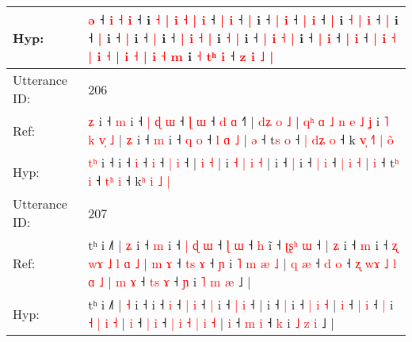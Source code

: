 \documentclass[10pt]{article}
\DeclareRobustCommand{\hl}[1]{{\textcolor{red}{#1}}}
\begin{document}
\begin{longtable}{ll}
 \\
Hyp: & \hl{}\hl{}\hl{}\hl{}\hl{}\hl{}\hl{}\hl{}\hl{ə} ˧ \hl{i} \hl{}\hl{˧} \hl{i} ˧\hl{}\hl{} i \hl{˧} \hl{|} \hl{i} \hl{˧} \hl{}\hl{}\hl{|} \hl{i} ˧ \hl{|} \hl{i} ˧ \hl{|} i\hl{}\hl{}\hl{}\hl{} ˧ \hl{}\hl{|} \hl{i} ˧ \hl{|} \hl{i} ˧ \hl{|} i \hl{˧} \hl{|} \hl{i} ˧ \hl{|} i ˧ \hl{|} i ˧ \hl{|} i ˧ \hl{|} i ˧ \hl{|} \hl{}\hl{i} \hl{˧} \hl{|} i \hl{˧} \hl{|} i ˧ \hl{}\hl{|} \hl{i} \hl{˧} \hl{|} i\hl{} ˧ \hl{}\hl{}\hl{|} \hl{i} ˧ \hl{|} \hl{i} ˧ \hl{}\hl{|} \hl{i} \hl{˧} \hl{|} \hl{i} \hl{˧} \hl{}\hl{|} \hl{i} \hl{˧} \hl{}\hl{|} \hl{i} \hl{˧} \hl{m} i\hl{}\hl{}\hl{}\hl{} \hl{˧} \hl{}\hl{t}\hl{ʰ} \hl{i} ˧ \hl{z}\hl{ }\hl{i} \hl{˩} \hl{|}
 \\
\midrule
Utterance ID: & 206 \\
Ref: & \hl{}\hl{ʑ} i ˧\hl{ }\hl{m} i ˧\hl{ }\hl{|}\hl{ }\hl{ɖ} \hl{ɯ} ˧\hl{ }\hl{ɭ} \hl{ɯ} ˧ \hl{d} \hl{ɑ} ˧\hl{˥} |\hl{ }\hl{d}\hl{ʑ} \hl{o} \hl{˩} |\hl{ }\hl{q}\hl{ʰ}\hl{ }\hl{ɑ}\hl{ }\hl{˩}\hl{ }\hl{n}\hl{ }\hl{e}\hl{ }\hl{˩}\hl{ }\hl{ʝ} i \hl{˥} \hl{k} \hl{v}\hl{̩} \hl{˩} |\hl{ }\hl{ʑ} i ˧ \hl{m} i ˧ \hl{q} \hl{o} ˧ \hl{l} \hl{ɑ} \hl{˩} | \hl{ə} ˧ t\hl{s} \hl{o} ˧\hl{ }\hl{|} \hl{d}\hl{ʑ} \hl{o} ˧ k\hl{ }\hl{v}\hl{̩} \hl{˧}\hl{˥} \hl{|} \hl{o}\hl{̃}
 \\
Hyp: & \hl{t}\hl{ʰ} i ˧\hl{}\hl{} i ˧\hl{}\hl{}\hl{}\hl{} \hl{i} ˧\hl{}\hl{} \hl{i} ˧ \hl{|} \hl{i} ˧\hl{} |\hl{}\hl{}\hl{} \hl{i} \hl{˧} |\hl{}\hl{}\hl{}\hl{}\hl{}\hl{}\hl{}\hl{}\hl{}\hl{}\hl{}\hl{}\hl{}\hl{}\hl{} i \hl{˧} \hl{|} \hl{}\hl{i} \hl{˧} |\hl{}\hl{} i ˧ \hl{|} i ˧ \hl{|} \hl{i} ˧ \hl{|} \hl{i} \hl{˧} | \hl{i} ˧ t\hl{ʰ} \hl{i} ˧\hl{}\hl{} \hl{t}\hl{ʰ} \hl{i} ˧ k\hl{}\hl{}\hl{ʰ} \hl{}\hl{i} \hl{˩} \hl{}\hl{|}
 \\
\midrule
Utterance ID: & 207 \\
Ref: & tʰ i ˩˥ | \hl{ʑ} i ˧\hl{ }\hl{m} i ˧\hl{ }\hl{|}\hl{ }\hl{ɖ} \hl{ɯ} ˧ \hl{ɭ} \hl{ɯ} ˧ \hl{h} i\hl{̃} ˧ \hl{ʈ}\hl{ʂ}\hl{ʰ} \hl{ɯ} ˧ |\hl{ }\hl{ʑ} i ˧ \hl{m} i ˧\hl{ }\hl{ʐ}\hl{ }\hl{w}\hl{ɤ}\hl{ }\hl{˩} \hl{l} \hl{ɑ} \hl{˩} |\hl{ }\hl{m} \hl{ɤ} ˧ \hl{t}\hl{s} \hl{ɤ} ˧ \hl{ɲ} i \hl{˥} \hl{m} \hl{æ} \hl{˩} |\hl{ }\hl{q} \hl{æ} ˧ \hl{d} \hl{o} ˧ \hl{ʐ} \hl{w}\hl{ɤ} \hl{˩} \hl{l} \hl{ɑ} \hl{˩} |\hl{ }\hl{m} \hl{ɤ} ˧ \hl{t}\hl{s} \hl{ɤ} ˧ \hl{ɲ} i \hl{˥} \hl{m} \hl{æ} ˩ |
 \\
Hyp: & tʰ i ˩˥ | \hl{˧} i ˧\hl{}\hl{} i ˧\hl{}\hl{}\hl{}\hl{} \hl{i} ˧ \hl{|} \hl{i} ˧ \hl{|} i\hl{} ˧ \hl{}\hl{}\hl{|} \hl{i} ˧ |\hl{}\hl{} i ˧ \hl{|} i ˧\hl{}\hl{}\hl{}\hl{}\hl{}\hl{}\hl{} \hl{|} \hl{i} \hl{˧} |\hl{}\hl{} \hl{i} ˧ \hl{}\hl{|} \hl{i} ˧ \hl{|} i \hl{˧} \hl{|} \hl{i} \hl{˧} |\hl{}\hl{} \hl{i} ˧ \hl{|} \hl{i} ˧ \hl{|} \hl{}\hl{i} \hl{˧} \hl{|} \hl{i} \hl{˧} |\hl{}\hl{} \hl{i} ˧ \hl{}\hl{m} \hl{i} ˧ \hl{k} i \hl{˩} \hl{z} \hl{i} ˩ |

\end{longtable}
\end{document}
